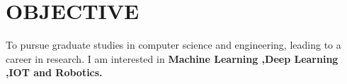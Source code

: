 \documentclass[margin,line]{res}
\begin{document}
\begin{resume}
\begin{tabular}{@{}p{3.5in}p{3in}}
		\end{tabular}
		
		\vspace{.1in}
	\section{\sc OBJECTIVE}

To pursue graduate studies in computer science and engineering, leading to a career in research. I am interested in \bf Machine Learning ,Deep Learning ,IOT and Robotics. 

\vspace{.1in}


\end{resume}
\end{document}
